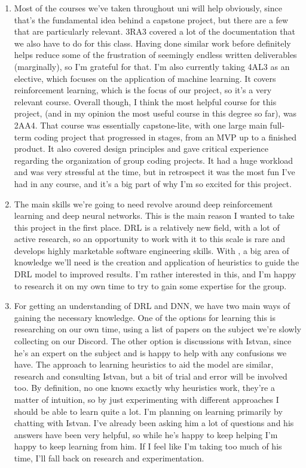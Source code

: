 \documentclass{article}
\begin{document}
\begin{enumerate}
    \item Most of the courses we've taken throughout uni will help obviously, since that's the fundamental idea behind a capstone project, but there are a few that are particularly relevant.
    3RA3 covered a lot of the documentation that we also have to do for this class.
    Having done similar work before definitely helps reduce some of the frustration of seemingly endless written deliverables (marginally), so I'm grateful for that.
    I'm also currently taking 4AL3 as an elective, which focuses on the application of machine learning.
    It covers reinforcement learning, which is the focus of our project, so it's a very relevant course.
    Overall though, I think the most helpful course for this project, (and in my opinion the most useful course in this degree so far), was 2AA4.
    That course was essentially capstone-lite, with one large main full-term coding project that progressed in stages, from an MVP up to a finished product.
    It also covered design principles and gave critical experience regarding the organization of group coding projects.
    It had a huge workload and was very stressful at the time, but in retrospect it was the most fun I've had in any course, and it's a big part of why I'm so excited for this project.

    \item The main skills we're going to need revolve around deep reinforcement learning and deep neural networks.
    This is the main reason I wanted to take this project in the first place.
    DRL is a relatively new field, with a lot of active research, so an opportunity to work with it to this scale is rare and develops highly marketable software engineering skills.
    With \emph{\Catan{}}, a big area of knowledge we'll need is the creation and application of heuristics to guide the DRL model to improved results.
    I'm rather interested in this, and I'm happy to research it on my own time to try to gain some expertise for the group.

    \item For getting an understanding of DRL and DNN, we have two main ways of gaining the necessary knowledge.
    One of the options for learning this is researching on our own time, using a list of papers on the subject we're slowly collecting on our Discord.
    The other option is discussions with Istvan, since he's an expert on the subject and is happy to help with any confusions we have.
    The approach to learning heuristics to aid the model are similar, research and consulting Istvan, but a bit of trial and error will be involved too.
    By definition, no one knows exactly why heuristics work, they're a matter of intuition, so by just experimenting with different approaches I should be able to learn quite a lot.
    I'm planning on learning primarily by chatting with Istvan.
    I've already been asking him a lot of questions and his answers have been very helpful, so while he's happy to keep helping I'm happy to keep learning from him.
    If I feel like I'm taking too much of his time, I'll fall back on research and experimentation.

\end{enumerate}
\end{document}
